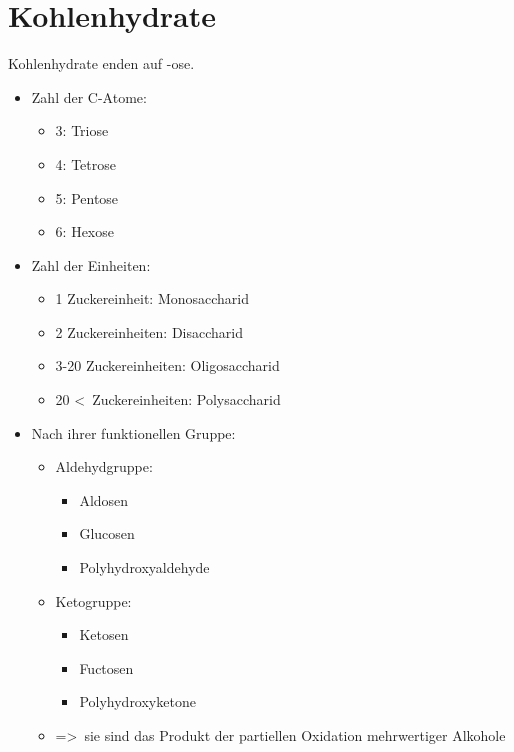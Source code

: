 
\section{Kohlenhydrate} \label{sec:kohlenhydrate}

Kohlenhydrate enden auf -ose.
\begin{itemize}
    \item Zahl der C-Atome:
        \begin{itemize}
            \item 3: Triose
            \item 4: Tetrose
            \item 5: Pentose
            \item 6: Hexose
        \end{itemize}
    \item Zahl der Einheiten:
        \begin{itemize}
            \item 1 Zuckereinheit: Monosaccharid
            \item 2 Zuckereinheiten: Disaccharid
            \item 3-20 Zuckereinheiten: Oligosaccharid
            \item 20 \textless\ Zuckereinheiten: Polysaccharid
        \end{itemize}
    \item Nach ihrer funktionellen Gruppe:
        \begin{itemize}
            \item Aldehydgruppe:
                \begin{itemize}
                    \item Aldosen
                    \item Glucosen
                    \item Polyhydroxyaldehyde
                \end{itemize}
            \item Ketogruppe:
                \begin{itemize}
                    \item Ketosen
                    \item Fuctosen
                    \item Polyhydroxyketone
                \end{itemize}
            \item =\textgreater\ sie sind das Produkt der partiellen Oxidation mehrwertiger Alkohole
        \end{itemize}
\end{itemize}
